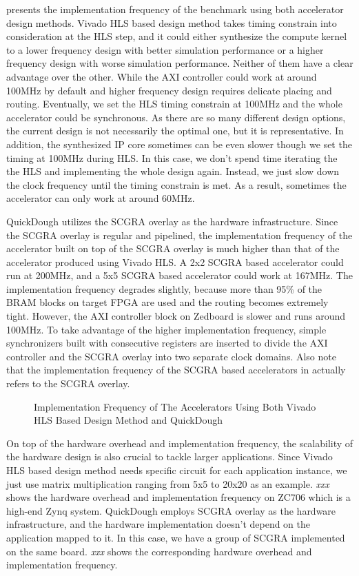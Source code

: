  presents the implementation frequency of the benchmark using both accelerator design methods. Vivado HLS based design method takes timing constrain into consideration at the HLS step, and it could either synthesize the compute kernel to a lower frequency design with better simulation performance or a higher frequency design with worse simulation performance. Neither of them have a clear advantage over the other. While the AXI controller could work at around 100MHz by default and higher frequency design requires delicate placing and routing. Eventually, we set the HLS timing constrain at 100MHz and the whole accelerator could be synchronous. As there are so many different design options, the current design is not necessarily the optimal one, but it is representative. In addition, the synthesized IP core sometimes can be even slower though we set the timing at 100MHz during HLS. In this case, we don't spend time iterating the the HLS and implementing the whole design again. Instead, we just slow down the clock frequency until the timing constrain is met. As a result, sometimes the accelerator can only work at around 60MHz.

QuickDough utilizes the SCGRA overlay as the hardware infrastructure. Since the SCGRA overlay is regular and pipelined, the implementation frequency of the accelerator built on top of the SCGRA overlay is much higher than that of the accelerator produced using Vivado HLS. A 2x2 SCGRA based accelerator could run at 200MHz, and a 5x5 SCGRA based accelerator could work at 167MHz. The implementation frequency degrades slightly, because more than 95\% of the BRAM blocks on target FPGA are used and the routing becomes extremely tight. However, the AXI controller block on Zedboard is slower and runs around 100MHz. To take advantage of the higher implementation frequency, simple synchronizers built with consecutive registers are inserted to divide the AXI controller and the SCGRA overlay into two separate clock domains. Also note that the implementation frequency of the SCGRA based accelerators in  actually refers to the SCGRA overlay.

\begin{figure*}[h]
\caption{Implementation Frequency of The Accelerators Using Both Vivado HLS Based Design Method and QuickDough}
\label{fig:impl-freq}
\end{figure*}

On top of the hardware overhead and implementation frequency, the scalability of the hardware design is also crucial to tackle larger applications. Since Vivado HLS based design method needs specific circuit for each application instance, we just use matrix multiplication ranging from 5x5 to 20x20 as an example. \emph{xxx} shows the hardware overhead and implementation frequency on ZC706 which is a high-end Zynq system. QuickDough employs SCGRA overlay as the hardware infrastructure, and the hardware implementation doesn't depend on the application mapped to it. In this case, we have a group of SCGRA implemented on the same board. \emph{xxx} shows the corresponding hardware overhead and implementation frequency.  

